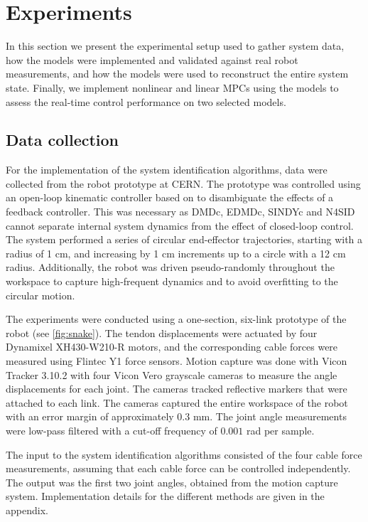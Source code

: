 \documentclass[../main.tex]{subfiles}
\begin{document}
\section{Experiments}
\label{sec:experiments}
In this section we present the experimental setup used to gather system data, how the models were implemented and validated against real robot measurements, and how the models were used to reconstruct the entire system state. Finally, we implement nonlinear and linear MPCs using the models to assess the real-time control performance on two selected models. 

\subsection{Data collection}
For the implementation of the system identification algorithms, data were collected from the robot prototype at CERN. The prototype was controlled using an open-loop kinematic controller based on \cite{hansen2025} to disambiguate the effects of a feedback controller. This was necessary as DMDc, EDMDc, SINDYc and N4SID cannot separate internal system dynamics from the effect of closed-loop control. The system performed a series of circular end-effector trajectories, starting with a radius of 1 cm, and increasing by 1 cm increments up to a circle with a 12 cm radius. Additionally, the robot was driven pseudo-randomly throughout the workspace to capture high-frequent dynamics and to avoid overfitting to the circular motion.

The experiments were conducted using a one-section, six-link prototype of the robot (see \cref{fig:snake}). The tendon displacements were actuated by four Dynamixel XH430-W210-R motors, and the corresponding cable forces were measured using Flintec Y1 force sensors. Motion capture was done with Vicon Tracker 3.10.2 with four Vicon Vero grayscale cameras to measure the angle displacements for each joint. The cameras tracked reflective markers that were attached to each link. The cameras captured the entire workspace of the robot with an error margin of approximately $0.3$ mm. The joint angle measurements were low-pass filtered with a cut-off frequency of $0.001$ rad per sample.

The input to the system identification algorithms consisted of the four cable force measurements, assuming that each cable force can be controlled independently. The output was the first two joint angles, obtained from the motion capture system.  Implementation details for the different methods are given in the appendix.
\end{document}
